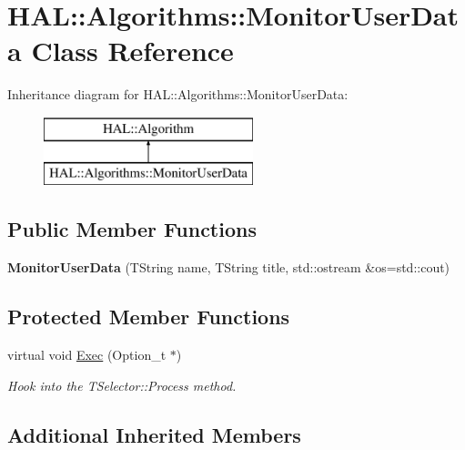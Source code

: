 \hypertarget{class_h_a_l_1_1_algorithms_1_1_monitor_user_data}{\section{H\+A\+L\+:\+:Algorithms\+:\+:Monitor\+User\+Data Class Reference}
\label{class_h_a_l_1_1_algorithms_1_1_monitor_user_data}
}
Inheritance diagram for H\+A\+L\+:\+:Algorithms\+:\+:Monitor\+User\+Data\+:\begin{figure}[H]
\begin{center}
\leavevmode
\includegraphics[height=2.000000cm]{class_h_a_l_1_1_algorithms_1_1_monitor_user_data}
\end{center}
\end{figure}
\subsection*{Public Member Functions}
\begin{DoxyCompactItemize}
\item 
\hypertarget{class_h_a_l_1_1_algorithms_1_1_monitor_user_data_acd4eeebf53037457c4b0e2095934a723}{{\bfseries Monitor\+User\+Data} (T\+String name, T\+String title, std\+::ostream \&os=std\+::cout)}\label{class_h_a_l_1_1_algorithms_1_1_monitor_user_data_acd4eeebf53037457c4b0e2095934a723}

\end{DoxyCompactItemize}
\subsection*{Protected Member Functions}
\begin{DoxyCompactItemize}
\item 
virtual void \hyperlink{class_h_a_l_1_1_algorithms_1_1_monitor_user_data_aea4229dea8ffbd7edfa8a4108e72205c}{Exec} (Option\+\_\+t $\ast$)
\begin{DoxyCompactList}\small\item\em Hook into the T\+Selector\+::\+Process method. \end{DoxyCompactList}\end{DoxyCompactItemize}
\subsection*{Additional Inherited Members}


